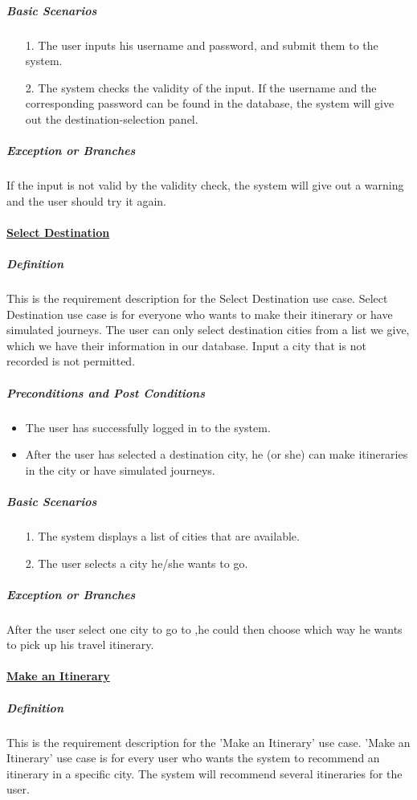 \documentclass[10pt]{article}
\begin{document}
\begin{itemize}
		\subparagraph{Basic Scenarios} 
		\begin{itemize}
			\item[1.] The user inputs his username and password, and submit them to the system.
		
			\item[2.] The system checks the validity of the input. If the username and the corresponding password can be found in the database, the system will give out the destination-selection panel.
		\end{itemize}

		\subparagraph{Exception or Branches}
		If the input is not valid by the validity check, the system will give out a warning and the user should try it again.

		\paragraph{\underline{Select Destination}}
		\subparagraph{Definition} This is the requirement description for the Select Destination use case. Select Destination use case is for everyone who wants to make their itinerary or have simulated journeys. The user can only select destination cities from a list we give, which we have their information in our database. Input a city that is not recorded is not permitted.

		\subparagraph{Preconditions and Post Conditions}
		\begin{itemize}
			\item The user has successfully logged in to the system.
			\item After the user has selected a destination city, he (or she) can make itineraries in the city or have simulated journeys.
		\end{itemize}

		\subparagraph{Basic Scenarios}
		\begin{itemize}
			\item[1.] The system displays a list of cities that are available.
			\item[2.] The user selects a city he/she wants to go.
		\end{itemize}

		\subparagraph{Exception or Branches}
		After the user select one city to go to ,he could then choose which way he wants to pick up his travel itinerary.

		\paragraph{\underline{Make an Itinerary}}
		\subparagraph{Definition}
		This is the requirement description for the 'Make an Itinerary' use case. 'Make an Itinerary' use case is for every user who wants the system to recommend an itinerary in a specific city. The system will recommend several itineraries for the user.


\end{itemize}
\end{document}
